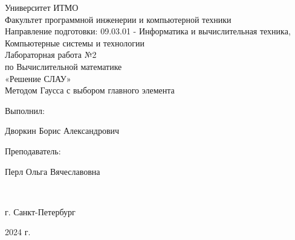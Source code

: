 \begin{center}
\hfill \break
\large{Университет ИТМО}\\
\large{Факультет программной инженерии и компьютерной техники}\\ 
\large{Направление подготовки: 09.03.01 - Информатика и вычислительная техника, Компьютерные системы и технологии}\\ 
\hfill\break
\hfill \break
\hfill \break
\hfill \break
\hfill \break
\hfill \break
\hfill \break
\hfill \break
\large{Лабораторная работа №2\\по Вычислительной математике\\«Решение СЛАУ»\\Методом Гаусса с выбором главного элемента}\\
\hfill \break
\hfill \break
\hfill \break
\hfill \break
\hfill \break
\end{center}
\hfill \break
\normalsize{ 
\begin{flushright}
Выполнил:
\par
Дворкин Борис Александрович
\par
Преподаватель:
\par
Перл Ольга Вячеславовна
\end{flushright}
}\\
\hfill \break
\hfill \break
\hfill \break
\hfill \break
\begin{center} г. Санкт-Петербург 
\par
2024 г. 
\end{center}
\thispagestyle{empty}
\thispagestyle{empty}
\thispagestyle{empty}